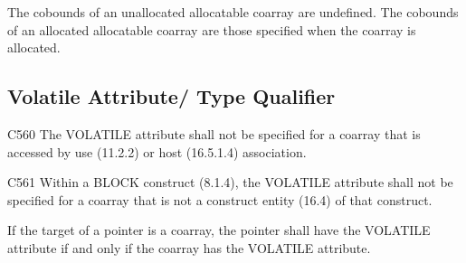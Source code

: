{\onlyF}
The cobounds of an unallocated allocatable coarray are undefined.
The cobounds of an allocated allocatable coarray are those specified 
when the coarray is allocated.

{\onlyC}


\subsection{Volatile {\onlyF} Attribute/{\onlyC} Type Qualifier}
\label{sec:Volatile}

C560 The VOLATILE attribute shall not be specified for a coarray that is accessed by use (11.2.2) or host (16.5.1.4) association.  %

C561 Within a BLOCK construct (8.1.4), the VOLATILE attribute shall not be specified for a coarray that is not a construct entity (16.4) of that construct.  %

If the target of a pointer is a coarray, the pointer shall have the VOLATILE attribute if and only if the coarray has the VOLATILE attribute.  %

